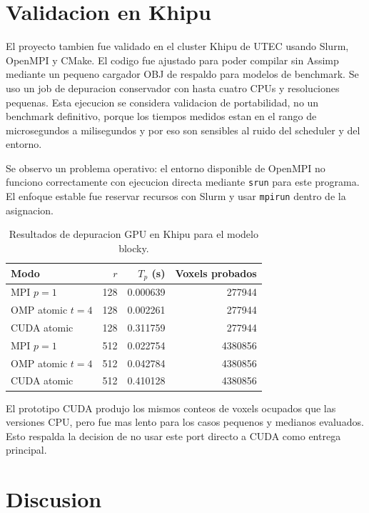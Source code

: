 \documentclass[conference]{IEEEtran}
\begin{document}
\section{Validacion en Khipu}

El proyecto tambien fue validado en el cluster Khipu de UTEC usando Slurm,
OpenMPI y CMake. El codigo fue ajustado para poder compilar sin Assimp mediante
un pequeno cargador OBJ de respaldo para modelos de benchmark. Se uso un job de
depuracion conservador con hasta cuatro CPUs y resoluciones pequenas. Esta
ejecucion se considera validacion de portabilidad, no un benchmark definitivo,
porque los tiempos medidos estan en el rango de microsegundos a milisegundos y
por eso son sensibles al ruido del scheduler y del entorno.

Se observo un problema operativo: el entorno disponible de OpenMPI no funciono
correctamente con ejecucion directa mediante \texttt{srun} para este programa.
El enfoque estable fue reservar recursos con Slurm y usar \texttt{mpirun} dentro
de la asignacion.

\begin{table}[t]
    \centering
    \caption{Resultados de depuracion GPU en Khipu para el modelo blocky.}
    \begin{tabular}{lrrr}
        \toprule
        Modo & $r$ & $T_p$ (s) & Voxels probados \\
        \midrule
        MPI $p=1$ & 128 & 0.000639 & 277944 \\
        OMP atomic $t=4$ & 128 & 0.002261 & 277944 \\
        CUDA atomic & 128 & 0.311759 & 277944 \\
        MPI $p=1$ & 512 & 0.022754 & 4380856 \\
        OMP atomic $t=4$ & 512 & 0.042784 & 4380856 \\
        CUDA atomic & 512 & 0.410128 & 4380856 \\
        \bottomrule
    \end{tabular}
\end{table}

El prototipo CUDA produjo los mismos conteos de voxels ocupados que las versiones
CPU, pero fue mas lento para los casos pequenos y medianos evaluados. Esto
respalda la decision de no usar este port directo a CUDA como entrega principal.

\section{Discusion}
\end{document}
